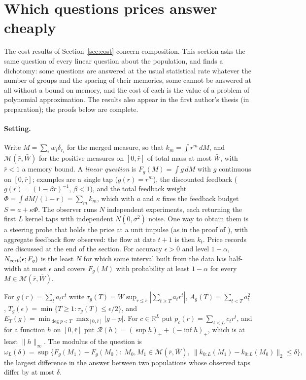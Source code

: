 \documentclass[12pt]{article}
\theoremstyle{definition}
\theoremstyle{remark}
\begin{document}
\section{Which questions prices answer cheaply}\label{app:questions}

The cost results of Section~\ref{sec:cost} concern composition. This section asks the same question of every linear question about the population, and finds a dichotomy: some questions are answered at the usual statistical rate whatever the number of groups and the spacing of their memories, some cannot be answered at all without a bound on memory, and the cost of each is the value of a problem of polynomial approximation. The results also appear in the first author's thesis (in preparation); the proofs below are complete.

\paragraph{Setting.} Write $M=\sum_iw_i\delta_{r_i}$ for the merged measure, so that $k_m=\int r^m\,dM$, and $\mathcal M(\bar r,\bar W)$ for the positive measures on $[0,\bar r]$ of total mass at most $\bar W$, with $\bar r<1$ a memory bound. A \emph{linear question} is $F_g(M)=\int g\,dM$ with $g$ continuous on $[0,\bar r]$; examples are a single tap ($g(r)=r^m$), the discounted feedback ($g(r)=(1-\beta r)^{-1}$, $\beta<1$), and the total feedback weight $\Phi=\int dM/(1-r)=\sum_m k_m$, which with $a$ and $\kappa$ fixes the feedback budget $S=a+\kappa\Phi$. The observer runs $N$ independent experiments, each returning the first $L$ kernel taps with independent $N(0,\sigma^2)$ noise. One way to obtain them is a steering probe that holds the price at a unit impulse (as in the proof of \citealp[their Theorem~S6.7]{niroula2026full}), with aggregate feedback flow observed: the flow at date $t+1$ is then $k_t$. Price records are discussed at the end of the section. For accuracy $\epsilon>0$ and level $1-\alpha$, $N_{\rm cert}(\epsilon;F_g)$ is the least $N$ for which some interval built from the data has half-width at most $\epsilon$ and covers $F_g(M)$ with probability at least $1-\alpha$ for every $M\in\mathcal M(\bar r,\bar W)$.

For $g(r)=\sum_ta_tr^t$ write $\tau_g(T)=\bar W\sup_{r\le\bar r}|\sum_{t\ge T}a_tr^t|$, $A_g(T)=\sum_{t<T}a_t^2$, $T_g(\epsilon)=\min\{T\ge1:\tau_g(T)\le\epsilon/2\}$, and $E_T(g)=\min_{\deg p<T}\max_{[0,\bar r]}|g-p|$. For $c\in\mathbb R^L$ put $p_c(r)=\sum_{t<L}c_tr^t$, and for a function $h$ on $[0,\bar r]$ put $\mathcal R(h)=(\sup h)_++(-\inf h)_+$, which is at least $\|h\|_\infty$. The modulus of the question is
\[
 \omega_L(\delta)=\sup\bigl\{F_g(M_1)-F_g(M_0):\ M_0,M_1\in\mathcal M(\bar r,\bar W),\ \|k_{0:L}(M_1)-k_{0:L}(M_0)\|_2\le\delta\bigr\},
\]
the largest difference in the answer between two populations whose observed taps differ by at most $\delta$.
\end{document}
